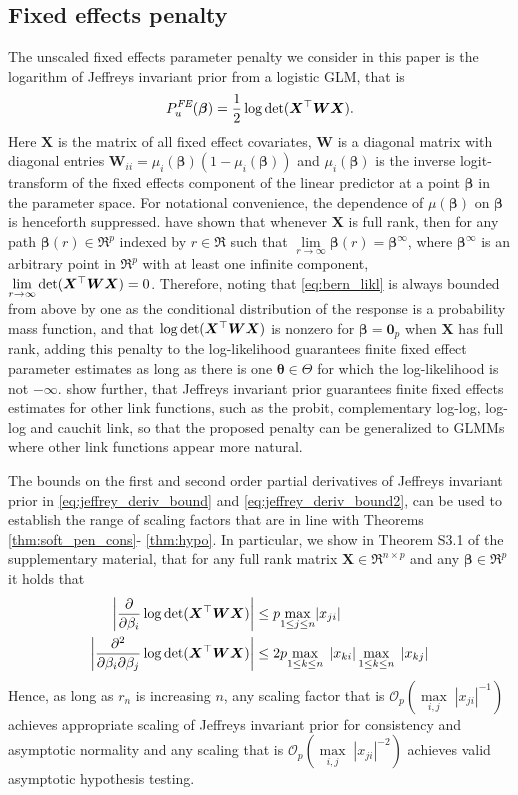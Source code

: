 \documentclass[11pt, a4paper]{article}
\newcommand*{\bb}{\boldsymbol}
\newcommand{\Op}[1]{\ensuremath{{\mathcal{O}_p(#1)}}}
\theoremstyle{example} \newtheorem{example}{Example}[section]
\theoremstyle{theorem} \newtheorem{theorem}{Theorem}[section]
\def\det{{\mathop{\rm det}}}
\def\bbeta{\bb{\beta}}
\def\btheta{\bb{\theta}}
\def\b0{\bb{0}}
\def\bX{\bb{X}}
\def\bW {\bb{W}}
\begin{document}
\subsection{Fixed effects penalty}
\label{sec:glmm_fe_pen}
The unscaled fixed effects parameter penalty we consider in this paper is the logarithm of Jeffreys invariant prior from a logistic GLM, that is $$P_u^{\textit{FE}}(\bbeta) =  \frac{1}{2}\log \det(\bX^\top \bW \bX).$$ Here $\bX$ is the matrix of all fixed effect covariates, $\bW$ is a diagonal matrix with diagonal entries $\bW_{ii} = \mu_i(\bbeta) (1-\mu_i(\bbeta))$ and $\mu_i(\bbeta)$ is the inverse logit-transform of the fixed effects component of the linear predictor at a point $\bbeta$ in the parameter space. For notational convenience, the dependence of $\mu(\bbeta)$ on $\bbeta$ is henceforth suppressed. \citet[Theorem 1]{kosmidis2021jeffreys} have shown that whenever $\bX$ is full rank, then for any path $\bbeta(r) \in \Re^p$ indexed by $r \in \Re$ such that $\lim\limits_{r \to \infty} \bbeta(r) = \bbeta^\infty$, where $\bbeta^\infty$ is an arbitrary point in $\Re^p$ with at least one infinite component, $\lim\limits_{r \to \infty} \det(\bX^\top\bW\bX) = 0$. Therefore, noting that \eqref{eq:bern_likl} is always bounded from above by one as the conditional distribution of the response is a probability mass function, and that $\log \det (\bX^\top \bW \bX)$ is nonzero for $\bbeta=\b0_p$ when $\bX$ has full rank, adding this penalty to the log-likelihood guarantees finite fixed effect parameter estimates as long as there is one $\btheta \in \Theta$ for which the log-likelihood is not $-\infty$. \citet{kosmidis2021jeffreys} show further, that Jeffreys invariant prior guarantees finite fixed effects estimates for other link functions, such as the probit, complementary log-log, log-log and cauchit link, so that the proposed penalty can be generalized to GLMMs where other link functions appear more natural. 

The bounds on the first and second order partial derivatives of Jeffreys invariant prior in \eqref{eq:jeffrey_deriv_bound} and \eqref{eq:jeffrey_deriv_bound2}, can be used to establish the range of scaling factors that are in line with Theorems \ref{thm:soft_pen_cons}- \ref{thm:hypo}. In particular, we show in Theorem S3.1 of the supplementary material, that for any full rank matrix $\bX \in \Re^{n \times p}$ and any $\bbeta \in \Re^p$ it holds that 
\begin{align}\label{eq:jeffrey_deriv_bound}
\left|\frac{\partial }{\partial \beta_i}\log \textrm{det}(\bX^\top\bW\bX)\right| & \leq p\underset{1\leq j\leq n}{\max} |x_{ji}| \\ \label{eq:jeffrey_deriv_bound2}
\left|\frac{\partial^2}{\partial \beta_i \partial \beta_j} \log\det (\bX^\top \bW \bX) \right| &\leq 2p\underset{1\leq k \leq n}{\max} \; \left|x_{ki}\right| \underset{1\leq k \leq n}{\max} \; \left|x_{kj}\right|  
\end{align}
Hence, as long as $r_n$ is increasing $n$, any scaling factor that is $\Op{\underset{i,j}{\max} \; |x_{ji}|^{-1}}$ achieves appropriate scaling of Jeffreys invariant prior for consistency and asymptotic normality and any scaling that is $\Op{\underset{i,j}{\max} \; |x_{ji}|^{-2}}$ achieves valid asymptotic hypothesis testing. 
\end{document}
